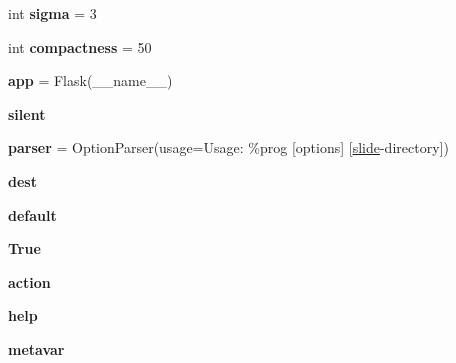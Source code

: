 \begin{DoxyCompactItemize}
int {\bfseries sigma} = 3
\item 
\mbox{\label{namespacedeepzoom__multiserver_aaac8855dd077c8a9000cca80f0f6a157}} 
int {\bfseries compactness} = 50
\item 
\mbox{\label{namespacedeepzoom__multiserver_ab2249eb66c1d0c07f3e7c264be537928}} 
{\bfseries app} = Flask(\+\_\+\+\_\+name\+\_\+\+\_\+)
\item 
\mbox{\label{namespacedeepzoom__multiserver_a5c7e3c2fc7a80c19f05dd012f776921b}} 
{\bfseries silent}
\item 
\mbox{\label{namespacedeepzoom__multiserver_aac693c7318af7d758b92303bfd737f6c}} 
{\bfseries parser} = Option\+Parser(usage=\textquotesingle{}Usage\+: \%prog \mbox{[}options\mbox{]} \mbox{[}\hyperlink{namespacedeepzoom__multiserver_a4d8664b2e2f006c8eaee41b95ff9ac32}{slide}-\/directory\mbox{]}\textquotesingle{})
\item 
\mbox{\label{namespacedeepzoom__multiserver_ac4e0861654c612672984a250f0498794}} 
{\bfseries dest}
\item 
\mbox{\label{namespacedeepzoom__multiserver_a25bc93200fed72074d87dc1c221bcc3c}} 
{\bfseries default}
\item 
\mbox{\label{namespacedeepzoom__multiserver_a7b8cc5cd186f1047d842487c46d19cb8}} 
{\bfseries True}
\item 
\mbox{\label{namespacedeepzoom__multiserver_aacd086822f323a781e3bf9c92509dbd5}} 
{\bfseries action}
\item 
\mbox{\label{namespacedeepzoom__multiserver_ae402d2b5439dd209e02e1e97d582d74b}} 
{\bfseries help}
\item 
\mbox{\label{namespacedeepzoom__multiserver_a1fb2c925c960c6924f77e321af8f5346}} 
{\bfseries metavar}
\item 
\mbox{\label{namespacedeepzoom__multiserver_a3ec9bb5db911f5a87769b40b6bb39349}} 

\end{DoxyCompactItemize}
